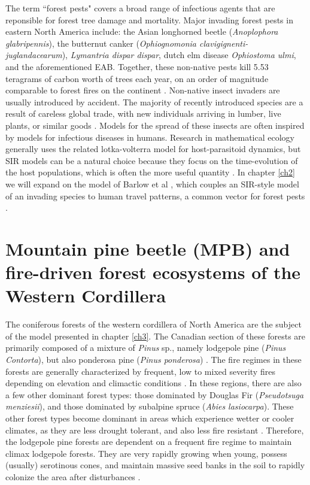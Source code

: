 The term ``forest pests" covers a broad range of infectious agents that are reponsible for forest tree damage and mortality. Major invading forest pests in eastern North America include: the Asian longhorned beetle (\textit{Anoplophora glabripennis}), the butternut canker (\textit{Ophiognomonia clavigignenti-juglandacearum}), \textit{Lymantria dispar dispar}, dutch elm disease \textit{Ophiostoma ulmi}, and the aforementioned EAB. Together, these non-native pests kill 5.53 teragrams of carbon worth of trees each year, on an order of magnitude comparable to forest fires on the continent \cite{fei2019biomass}. Non-native insect invaders are usually introduced by accident. The majority of recently introduced species are a result of careless global trade, with new individuals arriving in lumber, live plants, or similar goods \cite{brockerhoff2017ecology}. Models for the spread of these insects are often inspired by models for infectious diseases in humans. Research in mathematical ecology generally uses the related lotka-volterra model for host-parasitoid dynamics, but SIR models can be a natural choice because they focus on the time-evolution of the host populations, which is often the more useful quantity \cite{edelstein2005mathematical}. In chapter \ref{ch2} we will expand on the model of Barlow et al \cite{barlow2014modelling}, which couples an SIR-style model of an invading species to human travel patterns, a common vector for forest pests \cite{buck2009hitchhiking,kolar2001progress,wilson2009something}.

\section{Mountain pine beetle (MPB) and fire-driven forest ecosystems of the Western Cordillera}

The coniferous forests of the western cordillera of North America are the subject of the model presented in chapter \ref{ch3}. The Canadian section of these forests are primarily composed of a mixture of \textit {Pinus} sp., namely lodgepole pine (\textit{Pinus Contorta}), but also ponderosa pine (\textit{Pinus ponderosa}) \cite{brown2010impact}. The fire regimes in these forests are generally characterized by frequent, low to mixed severity fires depending on elevation and climactic conditions \cite{agee1996fire,arno1980forest}. In these regions, there are also a few other dominant forest types: those dominated by Douglas Fir (\textit{Pseudotsuga menziesii}), and those dominated by subalpine spruce (\textit{Abies lasiocarpa}). These other forest types become dominant in areas which experience wetter or cooler climates, as they are less drought tolerant, and also less fire resistant \cite{JENKINS200816}. Therefore, the lodgepole pine forests are dependent on a frequent fire regime to maintain climax lodgepole forests. They are very rapidly growing when young, possess (usually) serotinous cones, and maintain massive seed banks in the soil to rapidly colonize the area after disturbances \cite{lotan1976cone,lotan1985role}.

